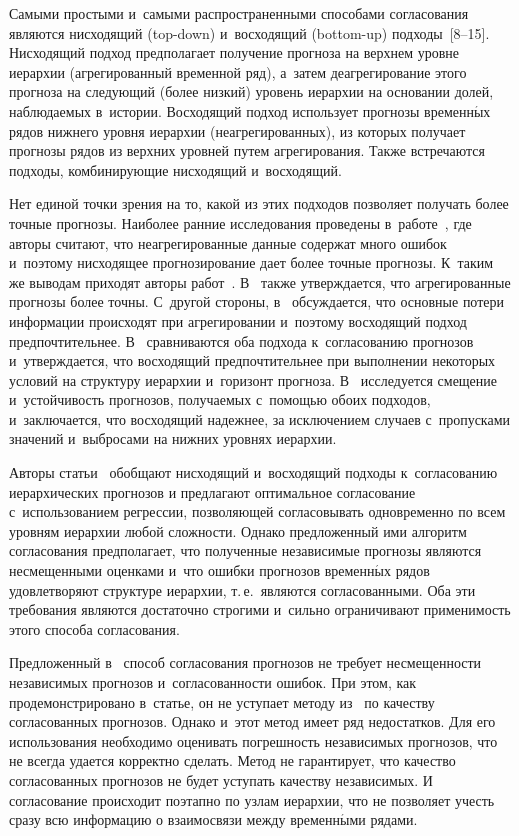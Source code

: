 \begin{multicols}{2}
Самыми простыми и~самыми распространенными способами
согласования являются нисходящий (top-down) и~восходящий
(bottom-up) подходы~[8--15]. Нисходящий подход
предполагает получение прогноза на верхнем уровне иерархии
(агрегированный временной ряд), а~затем деагрегирование этого
прогноза на сле\-ду\-ющий (более низкий) уровень иерархии на основании
долей, наблюдаемых в~истории. Восходящий подход использует
прогнозы временн$\acute{\mbox{ы}}$х рядов нижнего уровня иерархии
(неагрегированных), из которых получает прогнозы рядов из верхних
уровней путем агрегирования. Также встречаются подходы,
комбинирующие нисходящий и~восходящий.

Нет единой точки зрения на то, какой из этих подходов позволяет
получать более точные прогнозы. Наиболее ранние исследования
проведены в~работе~\cite{grunfeld1960aggregation}, где авторы
считают, что неагрегированные данные содержат много ошибок и~поэтому нисходящее прогнозирование дает более точные прогнозы.
К~таким же выводам приходят авторы работ~\cite{fogarty1991production, narasimhan1995production}. В~\cite{fliedner1999investigation} также утверждается, что
агрегированные прогнозы более точны. С~другой стороны, в~\cite{orcutt1968data, edwards1969should} обсуждается, что основные
потери информации происходят при агрегировании и~поэтому
восходящий подход предпочтительнее. В~\cite{shlifer1979aggregation} сравниваются оба подхода к~согласованию прогнозов и~утверждается, что восходящий
предпочтительнее при выполнении некоторых условий на структуру
иерархии и~горизонт прогноза. В~\cite{schwarzkopf1988top}
исследуется смещение и~устойчивость прогнозов, получаемых с~помощью обоих подходов, и~заключается, что восходящий  надежнее,
за исключением случаев с~пропусками значений и~выбросами на нижних
уровнях иерархии.

Авторы статьи~\cite{hyndman2011optimal} обобщают нисходящий и~восходящий подходы к~согласованию иерархических прогнозов
и предлагают оптимальное согласование с~использованием регрессии,
позволяющей согласовывать одновременно по всем уровням иерархии
любой сложности. Однако предложенный ими алгоритм согласования
предполагает, что полученные независимые прогнозы являются
несмещенными оценками и~что ошибки прогнозов временн$\acute{\mbox{ы}}$х рядов
удовлетворяют структуре иерархии, т.\,е.\ являются согласованными.
Оба эти требования являются достаточно строгими и~сильно
ограничивают применимость этого способа согласования.

Предложенный в~\cite{stenina2014reconciliation} способ
согласования прогнозов не требует несмещенности независимых
прогнозов и~согласованности ошибок. При этом, как
продемонстрировано в~статье, он не уступает методу из~\cite{hyndman2011optimal} по качеству согласованных прогнозов.
Однако и~этот метод имеет ряд недостатков. Для его использования
необходимо оценивать погрешность независимых прогнозов, что не
всегда удается корректно сделать. Метод не гарантирует, что
качество согласованных прогнозов не будет уступать качеству
независимых. И согласование происходит поэтапно по узлам иерархии,
что не позволяет учесть сразу всю информацию о взаимосвязи между
временн$\acute{\mbox{ы}}$ми рядами.


\end{multicols}
